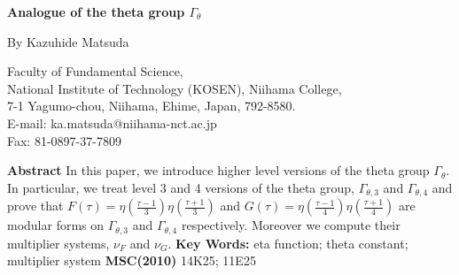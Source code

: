 \documentclass[12pt]{article}
\theoremstyle{definition}
\numberwithin{equation}{section}
\numberwithin{theorem}{section}
\begin{document}
\begin{center}
{\bf{\Large Analogue of the theta group $\Gamma_{\theta}$ }}
\end{center}


\begin{center}
By Kazuhide Matsuda
\end{center}

\begin{center}
Faculty of Fundamental Science, \\
National Institute of Technology (KOSEN), Niihama College,\\
7-1 Yagumo-chou, Niihama, Ehime, Japan, 792-8580. \\
E-mail: ka.matsuda@niihama-nct.ac.jp  \\
Fax: 81-0897-37-7809 
\end{center} 


\noindent
{\bf Abstract}
In this paper, we introduce higher level versions of the theta group $\Gamma_{\theta}.$ 
In particular, we treat level 3 and 4 versions of the theta group, $\Gamma_{\theta,3}$ and $\Gamma_{\theta,4}$  
and 
prove that 
$\displaystyle F(\tau)=\eta \left(\frac{\tau-1}{3} \right) \eta\left(\frac{\tau+1}{3} \right)$ 
and 
$\displaystyle G(\tau)=\eta \left(\frac{\tau-1}{4} \right) \eta\left(\frac{\tau+1}{4} \right)$ 
are modular forms on $\Gamma_{\theta,3}$ and $\Gamma_{\theta,4}$ respectively. 
Moreover 
we compute their multiplier systems, $\nu_{F}$ and $\nu_{G}$.  
\newline
{\bf Key Words:} eta function; theta constant; multiplier system
\newline
{\bf MSC(2010)}  14K25;  11E25 
\end{document}
